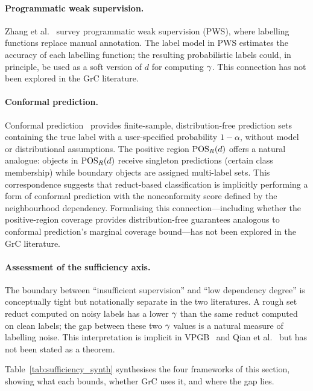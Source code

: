 \paragraph{Programmatic weak supervision.}
Zhang et al.~\cite{Zhang2022PWS} survey programmatic weak supervision
(PWS), where labelling functions replace manual annotation.  The label model
in PWS estimates the accuracy of each labelling function; the resulting
probabilistic labels could, in principle, be used as a soft version of $d$
for computing $\gamma$.  This connection has not been explored in the GrC
literature.

\paragraph{Conformal prediction.}
Conformal prediction~\cite{Angelopoulos2023CP} provides finite-sample,
distribution-free prediction sets containing the true label with a
user-specified probability $1-\alpha$, without model or distributional
assumptions.  The positive region $\mathrm{POS}_R(d)$ offers a natural analogue: objects
in $\mathrm{POS}_R(d)$ receive singleton predictions (certain class membership) while
boundary objects are assigned multi-label sets.  This correspondence suggests
that reduct-based classification is implicitly performing a form of conformal
prediction with the nonconformity score defined by the neighbourhood
dependency.  Formalising this connection---including whether the positive-region coverage
provides distribution-free guarantees analogous to conformal prediction's
marginal coverage bound---has not been explored in the GrC literature.

\paragraph{Assessment of the sufficiency axis.}
The boundary between ``insufficient supervision'' and ``low dependency
degree'' is conceptually tight but notationally separate in the two
literatures.  A rough set reduct computed on noisy labels has a lower
$\gamma$ than the same reduct computed on clean labels; the gap between these
two $\gamma$ values is a natural measure of labelling noise.  This
interpretation is implicit in VPGB~\cite{Peng2022VPGB} and Qian et
al.~\cite{Qian2023InfoFusion} but has not been stated as a theorem.

Table~\ref{tab:sufficiency_synth} synthesises the four frameworks of this
section, showing what each bounds, whether GrC uses it, and where the gap
lies.


